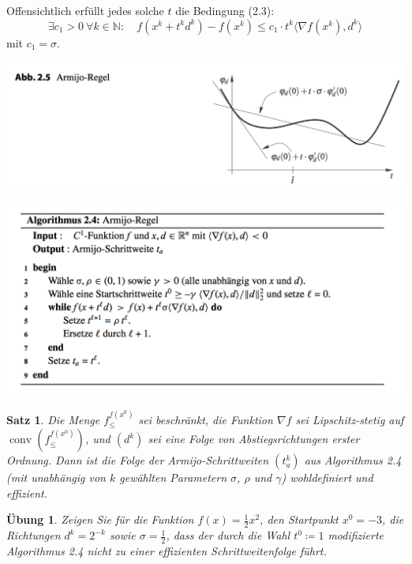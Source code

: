 \documentclass[11pt]{scrreprt}
\newcounter{thm}
\theoremstyle{thmstyle}
\numberwithin{thm}{section}
\newtheorem{satz}[thm]{Satz}
\newtheorem{uebung}[thm]{Übung}
\begin{document}
	Offensichtlich erfüllt jedes solche $t$ die Bedingung (2.3):
	$$ \exists c_1 > 0 ~\forall k\in \mathbb{N}: \quad f(x^k + t^k d^k) - f(x^k) \leq c_1 \cdot t^k \langle \nabla f(x^k), d^k \rangle $$
	 mit $c_1 = \sigma$.
	
\begin{center}
	\includegraphics[scale=0.5]{img/ab25}
\end{center}	

\begin{center}
	\includegraphics[scale=0.5]{img/a24}
\end{center}

\begin{satz}
	Die Menge $f_{\leq}^{f(x^0)}$ sei beschränkt, die Funktion $\nabla f$ sei Lipschitz-stetig auf $\operatorname{conv}(f_{\leq}^{f(x^0)})$, und $(d^k)$ sei eine Folge von Abstiegsrichtungen erster Ordnung. Dann ist die Folge der Armijo-Schrittweiten $(t_a^k)$ aus Algorithmus 2.4 (mit unabhängig von $k$ gewählten Parametern $\sigma$, $\rho$ und $\gamma$) wohldefiniert und effizient.
\end{satz}

\begin{uebung}
	Zeigen Sie für die Funktion $f(x) = \frac{1}{2} x^2$, den Startpunkt $x^0 = -3$, die Richtungen $d^k = 2^{-k}$ sowie $\sigma = \frac{1}{2}$, dass der durch die Wahl $t^0 \coloneqq 1$ modifizierte Algorithmus 2.4 nicht zu einer effizienten Schrittweitenfolge führt.
\end{uebung}
\end{document}
